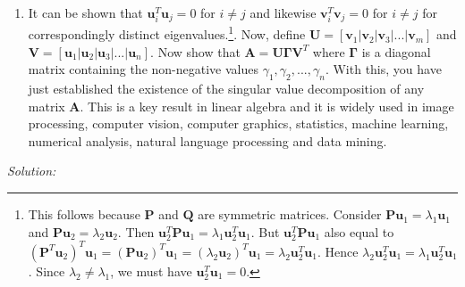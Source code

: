 \documentclass[11pt]{article}
\begin{document}
\begin{enumerate}
\begin{enumerate}
\item It can be shown that $\boldsymbol{u}^T_i \boldsymbol{u}_j = 0$ for $i \neq j$ and likewise $\boldsymbol{v}^T_i \boldsymbol{v}_j = 0$ for $i \neq j$ for correspondingly distinct eigenvalues.\footnote{This follows because $\boldsymbol{P}$ and $\boldsymbol{Q}$ are symmetric matrices. Consider $\boldsymbol{Pu}_1 = \lambda_1 \boldsymbol{u}_1$ and $\boldsymbol{Pu}_2 = \lambda_2 \boldsymbol{u}_2$. Then $\boldsymbol{u}^T_2 \boldsymbol{P u}_1 = \lambda_1 \boldsymbol{u}^T_2 \boldsymbol{u}_1$. But $\boldsymbol{u}^T_2 \boldsymbol{P} \boldsymbol{u}_1$ also equal to $(\boldsymbol{P}^T \boldsymbol{u}_2)^T \boldsymbol{u}_1 = (\boldsymbol{P} \boldsymbol{u}_2)^T \boldsymbol{u}_1 = (\lambda_2 \boldsymbol{u}_2)^T \boldsymbol{u}_1 = \lambda_2 \boldsymbol{u}^T_2 \boldsymbol{u}_1$. Hence $\lambda_2 \boldsymbol{u}^T_2 \boldsymbol{u}_1 = \lambda_1 \boldsymbol{u}^T_2 \boldsymbol{u}_1$. Since $\lambda_2 \neq \lambda_1$, we must have $\boldsymbol{u}^T_2 \boldsymbol{u}_1 = 0$. }. Now, define $\boldsymbol{U} = [\boldsymbol{v}_1 | \boldsymbol{v}_2 | \boldsymbol{v}_3 | ...|\boldsymbol{v}_m]$ and $\boldsymbol{V} = [\boldsymbol{u}_1 | \boldsymbol{u}_2 | \boldsymbol{u}_3 | ... |\boldsymbol{u}_n]$. Now show that $\boldsymbol{A} = \boldsymbol{U} \boldsymbol{\Gamma} \boldsymbol{V}^T$ where $\boldsymbol{\Gamma}$ is a diagonal matrix containing the non-negative values $\gamma_1, \gamma_2, ..., \gamma_n$. With this, you have just established the existence of the singular value decomposition of any matrix $\boldsymbol{A}$. This is a key result in linear algebra and it is widely used in image processing, computer vision, computer graphics, statistics, machine learning, numerical analysis, natural language processing and data mining.
\end{enumerate}
\end{enumerate}

{\em Solution:}
\vspace*{1em}
\end{document}
